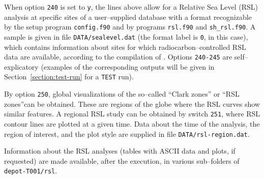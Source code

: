 \documentclass[11pt,fleqn,a4paper,titlepage]{article}
\begin{document}
\vspace{0.4cm}

{\color{Magenta}{\scriptsize\begin{verbatim}
    ...
    ====> RSL PREDICTIONS AT SPECIFIC SITES ---------------------------------------
    240    RSL analysis (y/n), database & format   'y'  'my_sealevel_database.txt'   '7'
    241    Plot of RSL sites distribution (y/n)                            'y' 
    242    Site-by-site RSL predictions vs data & plots (y/n)           'y'  'y'
    243    Scatterplot of RSL data & predictions (y/n)     	      'n' 
    244    Misfit between RSL data & predictions (y/n)           'n'
    245    Table with all RSL data & predictions (y/n)       'y'

    ====> RSL REGIONS -------------------------------------------------------------
    250    Gobal RSL zones  	                           'n'
    251    Regional RSL contour lines                           'n'   'rsl-region.dat'
    ...
\end{verbatim} }}
\noindent When option \texttt{240} is set to \texttt{y}, the lines above allow for a Relative Sea Level (RSL) analysis at specific sites of a user--supplied database with a format recognizable by the setup program \texttt{config.f90} and by programs \texttt{rsl.f90} and \texttt{sh\_rsl.f90}. A sample is given in file \texttt{DATA/sealevel.dat} (the format label is \texttt{0}, in this case), which contains information about sites for which 
radiocarbon--controlled RSL data are available, according to the compilation of \citet{Tushingham_and_Peltier_1992,Tushingham_and_Peltier_1993}. Options \texttt{240-245} are self--explicatory (examples of the corresponding outputs will be given in Section~\ref{section:test-run} for a \texttt{TEST} run). 

By option \texttt{250}, global visualizations of the so--called ``Clark zones'' \citep{Clark_etal_1978} 
or ``RSL zones''can be obtained. These are regions of the globe where the RSL curves show similar features. A regional RSL study can be obtained by switch \texttt{251}, where RSL contour lines are plotted at a given time. Data
about the time of the analysis, the region of interest, and the plot style are supplied in file
\texttt{DATA/rsl-region.dat}. 

Information about the RSL analyses (tables with ASCII data and plots, if 
requested) are made available, after the execution, in various sub--folders of  
\texttt{depot-T001/rsl}. 
\end{document}
